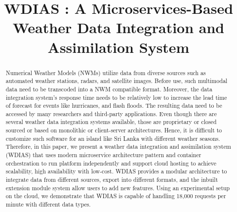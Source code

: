 \documentclass[conference]{IEEEtran}
\begin{document}
\title{WDIAS : A Microservices-Based Weather Data Integration and Assimilation System\\
}

\author{
\and
{}
\and
{}
}

\maketitle

\begin{abstract}
Numerical Weather Models (NWMs) utilize data from diverse sources such as automated weather stations, radars, and satellite images. Before use, such multimodal data need to be transcoded into a NWM compatible format. Moreover, the data integration system's response time needs to be relatively low to increase the lead time of forecast for events like hurricanes, and flash floods. The resulting data need to be accessed by many researchers and third-party applications. Even though there are several weather data integration systems available, those are proprietary or closed sourced or based on monolithic or client-server architectures. Hence, it is difficult to customize such software for an island like Sri Lanka with different weather seasons. Therefore, in this paper, we present a weather data integration and assimilation system (WDIAS) that uses modern microservice architecture pattern and container orchestration to run platform independently and support cloud hosting to achieve scalability, high availability with low-cost. WDIAS provides a modular architecture to integrate data from different sources, export into different formats, and the inbuilt extension module system allow users to add new features. Using an experimental setup on the cloud, we demonstrate that WDIAS is capable of handling 18,000 requests per minute with different data types.
\end{abstract}
\end{document}
